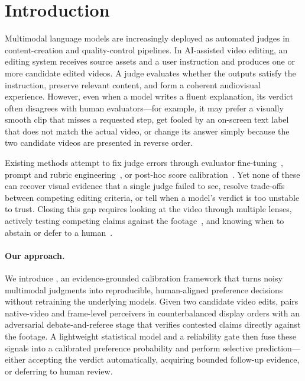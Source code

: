 \section{Introduction}
\label{sec:intro}

Multimodal language models are increasingly deployed as automated judges in content-creation and quality-control pipelines. In AI-assisted video editing, an editing system receives source assets and a user instruction and produces one or more candidate edited videos. A judge evaluates whether the outputs satisfy the instruction, preserve relevant content, and form a coherent audiovisual experience. However, even when a model writes a fluent explanation, its verdict often disagrees with human evaluators---for example, it may prefer a visually smooth clip that misses a requested step, get fooled by an on-screen text label that does not match the actual video, or change its answer simply because the two candidate videos are presented in reverse order.

Existing methods attempt to fix judge errors through evaluator fine-tuning~\cite{prometheusvision,videoscore}, prompt and rubric engineering~\cite{geval,autocalibrate,calitree}, or post-hoc score calibration~\cite{quantllmj,mtbench}. Yet none of these can recover visual evidence that a single judge failed to see, resolve trade-offs between competing editing criteria, or tell when a model's verdict is too unstable to trust. Closing this gap requires looking at the video through multiple lenses, actively testing competing claims against the footage~\cite{chateval}, and knowing when to abstain or defer to a human~\cite{geifman2017selective,madras2018predict}.

\paragraph{Our approach.}
We introduce \critical, an evidence-grounded calibration framework that turns noisy multimodal judgments into reproducible, human-aligned preference decisions without retraining the underlying models. Given two candidate video edits, \critical pairs native-video and frame-level perceivers in counterbalanced display orders with an adversarial debate-and-referee stage that verifies contested claims directly against the footage. A lightweight statistical model and a reliability gate then fuse these signals into a calibrated preference probability and perform selective prediction---either accepting the verdict automatically, acquiring bounded follow-up evidence, or deferring to human review.

